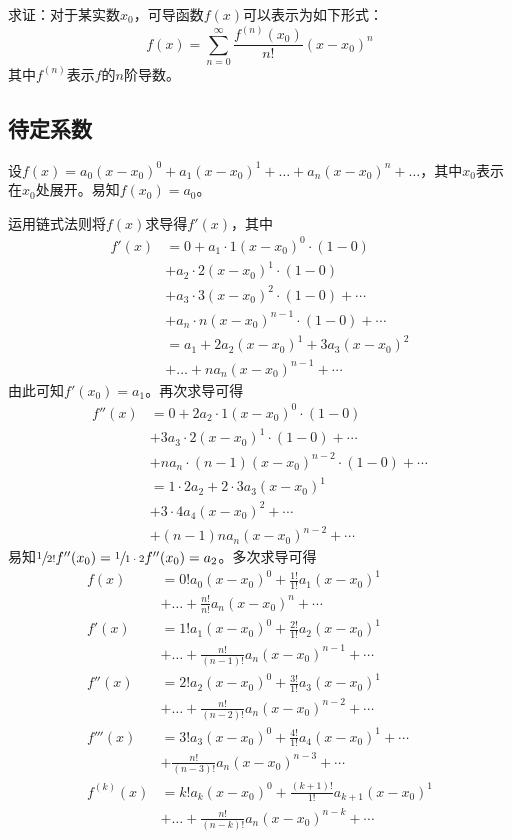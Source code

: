 

求证：对于某实数$x_0$，可导函数$f(x)$可以表示为如下形式：
\[ f(x) = \sum_{n = 0}^\infty \frac{f^{(n)}(x_0)}{n!}(x - x_0)^n \]
其中$f^{(n)}$表示$f$的$n$阶导数。

\subsection{待定系数}

设$f(x) = a_0(x - x_0)^0 + a_1(x - x_0)^1 + \dots + a_n(x - x_0)^n + \dots$，其中$x_0$表示在$x_0$处展开。易知$f(x_0) = a_0$。

运用链式法则将$f(x)$求导得$f'(x)$，其中
\begin{align*}
  f'(x) &= 0 + a_1\cdot1(x - x_0)^0\cdot(1 - 0) \\
  &+ a_2\cdot2(x - x_0)^1\cdot(1 - 0) \\
  &+ a_3\cdot3(x - x_0)^2\cdot(1 - 0) + \cdots \\
  &+ a_n\cdot n(x - x_0)^{n - 1}\cdot(1 - 0) + \cdots \\
  &= a_1 + 2a_2(x - x_0)^1 + 3a_3(x - x_0)^2 \\
  &+ \dots + na_n(x - x_0)^{n - 1} + \cdots
\end{align*}
由此可知$f'(x_0) = a_1$。再次求导可得
\begin{align*}
  f''(x) &= 0 + 2a_2\cdot1(x - x_0)^0\cdot(1 - 0) \\
  &+ 3a_3\cdot2(x - x_0)^1\cdot(1 - 0) + \cdots \\
  &+ na_n\cdot(n - 1)(x - x_0)^{n - 2}\cdot(1 - 0) + \cdots \\
  &= 1\cdot2a_2 + 2\cdot3a_3(x - x_0)^1 \\
  &+ 3\cdot4a_4(x - x_0)^2 + \cdots \\
  &+ (n - 1)na_n(x - x_0)^{n - 2} + \cdots
\end{align*}
易知$\sfrac1{2!}f''(x_0) = \sfrac1{1\cdot2}f''(x_0) = a_2$。多次求导可得
\begin{align*}
  f(x) &= 0!a_0(x - x_0)^0 + \frac{1!}{1!}a_1(x - x_0)^1 \\
  &+ \dots + \frac{n!}{n!}a_n(x - x_0)^n + \cdots \\
  f'(x) &= 1!a_1(x - x_0)^0 + \frac{2!}{1!}a_2(x - x_0)^1 \\
  &+ \dots + \frac{n!}{(n - 1)!}a_n(x - x_0)^{n - 1} + \cdots \\
  f''(x) &= 2!a_2(x - x_0)^0 + \frac{3!}{1!}a_3(x - x_0)^1 \\
  &+ \dots + \frac{n!}{(n - 2)!}a_n(x - x_0)^{n - 2} + \cdots \\
  f'''(x) &= 3!a_3(x - x_0)^0 + \frac{4!}{1!}a_4(x - x_0)^1 + \cdots \\
  &+ \frac{n!}{(n - 3)!}a_n(x - x_0)^{n - 3} + \cdots \\
  f^{(k)}(x) &= k!a_k(x - x_0)^0 + \frac{(k + 1)!}{1!}a_{k + 1}(x - x_0)^1 \\
  &+ \dots + \frac{n!}{(n - k)!}a_n(x - x_0)^{n - k} + \cdots
\end{align*}
